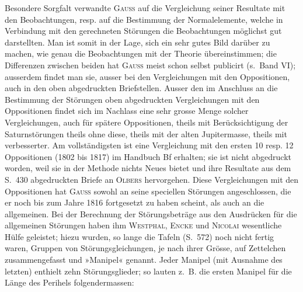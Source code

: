 \par\noindent\hspace*{\parindent}Besondere Sorgfalt verwandte \textsc{Gauss} auf die Vergleichung seiner Resultate mit den Beobachtungen,
resp. auf die Bestimmung der Normalelemente, welche in Verbindung mit den gerechneten Störungen die
Beobachtungen möglichst gut darstellten. Man ist somit in der Lage, sich ein sehr gutes Bild darüber
zu machen, wie genau die Beobachtungen mit der Theorie übereinstimmen; die Differenzen zwischen beiden
hat \textsc{Gauss} meist schon selbst publicirt (s.~Band VI); ausserdem findet man sie, ausser bei den Vergleichungen
mit den Oppositionen, auch in den oben abgedruckten Briefstellen. Ausser den im Anschluss an die Bestimmung
der Störungen oben abgedruckten Vergleichungen mit den Oppositionen findet sich im Nachlass
eine sehr grosse Menge solcher Vergleichungen, auch für spätere Oppositionen, theils mit Berücksichtigung
der Saturnstörungen theils ohne diese, theils mit der alten Jupitermasse, theils mit verbesserter.
Am vollständigsten ist eine Vergleichung mit den ersten 10 resp. 12 Oppositionen (1802 bis 1817) im Handbuch
Bf erhalten; sie ist nicht abgedruckt worden, weil sie in der Methode nichts Neues bietet und ihre
Resultate aus dem S.~430 abgedruckten Briefe an \textsc{Olbers} hervorgehen. Diese Vergleichungen mit den Oppositionen
hat \textsc{Gauss} sowohl an seine speciellen Störungen angeschlossen, die er noch bis zum Jahre 1816
fortgesetzt zu haben scheint, als auch an die allgemeinen. Bei der Berechnung der Störungsbeträge aus
den Ausdrücken für die allgemeinen Störungen haben ihm \textsc{Westphal}, \textsc{Encke} und \textsc{Nicolai} wesentliche
Hülfe geleistet; hiezu wurden, so lange die Tafeln (S.~572) noch nicht fertig waren, Gruppen von Störungsgleichungen,
je nach ihrer Grösse, auf Zettelchen zusammengefasst und »Manipel« genannt. Jeder Manipel
(mit Ausnahme des letzten) enthielt zehn Störungsglieder; so lauten z.~B. die ersten Manipel für die
Länge des Perihels folgendermassen:

